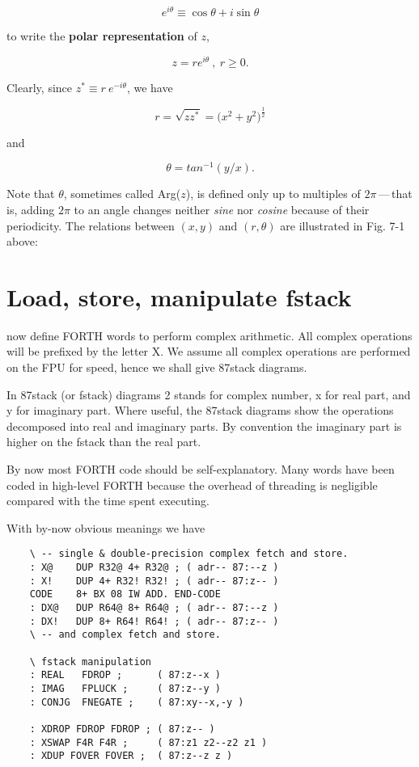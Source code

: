 \begin{equation}
  e^{i\theta} \equiv \cos \theta + i \sin \theta
\end{equation}

to write the \textbf{polar representation} of $z$,

\begin{equation}
  z = re^{i\theta}\ ,\ r \geq 0.
\end{equation}

Clearly, since $z^* \equiv r\ e^{-i\theta}$, we have

\begin{equation}
  r = \sqrt{zz^*} = \big(x^2 + y^2\big)^\frac{1}{2}
\end{equation}

and

\begin{equation}
  \theta = tan^{-1}(y/x).
\end{equation}

Note that $\theta$, sometimes called Arg($z$), is defined only up to multiples of $2\pi$\,---\,that is, adding $2\pi$ to an angle changes neither \textit{sine} nor \textit{cosine} because of their periodicity. The relations between $(x,y)$ and $(r,\theta)$ are illustrated in Fig. 7-1 above:

\section{Load, store, manipulate fstack}
 now define FORTH words to perform complex arithmetic. All complex operations will be prefixed by the letter X. We assume all complex operations are performed on the FPU for speed, hence we shall give 87stack diagrams.

In 87stack (or fstack) diagrams 2 stands for complex number, x for real part, and y for imaginary part. Where useful, the 87stack diagrams show the operations decomposed into real and imaginary parts. By convention the imaginary part is higher on the fstack than the real part.

By now most FORTH code should be self-explanatory. Many words have been coded in high-level FORTH because the overhead of threading is negligible compared with the time spent executing.

With by-now obvious meanings we have

\begin{lstlisting}
    \ -- single & double-precision complex fetch and store.
    : X@    DUP R32@ 4+ R32@ ; ( adr-- 87:--z )
    : X!    DUP 4+ R32! R32! ; ( adr-- 87:z-- )
    CODE    8+ BX 08 IW ADD. END-CODE
    : DX@   DUP R64@ 8+ R64@ ; ( adr-- 87:--z )
    : DX!   DUP 8+ R64! R64! ; ( adr-- 87:z-- )
    \ -- and complex fetch and store.

    \ fstack manipulation
    : REAL   FDROP ;      ( 87:z--x )
    : IMAG   FPLUCK ;     ( 87:z--y )
    : CONJG  FNEGATE ;    ( 87:xy--x,-y )

    : XDROP FDROP FDROP ; ( 87:z-- )
    : XSWAP F4R F4R ;     ( 87:z1 z2--z2 z1 )
    : XDUP FOVER FOVER ;  ( 87:z--z z )
\end{lstlisting}

